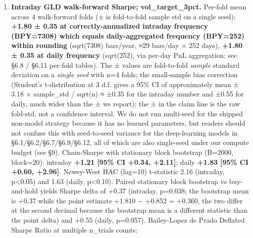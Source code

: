 \documentclass[
]{article}
\providecommand{\tightlist}{%
  \setlength{\itemsep}{0pt}\setlength{\parskip}{0pt}}
\begin{document}
\begin{enumerate}
\def\labelenumi{\arabic{enumi}.}
\tightlist
\item
  \textbf{Intraday GLD walk-forward Sharpe; vol\_target\_3pct.} Per-fold
  mean across 4 walk-forward folds (± is fold-to-fold sample std on a
  single seed): \textbf{+1.80 ± 0.35 at correctly-annualized intraday
  frequency (BPY=7308) which equals daily-aggregated frequency (BPY=252)
  within rounding} (sqrt(7308) bars/year, ≈29 bars/day × 252 days),
  \textbf{+1.80 ± 0.35 at daily frequency} (sqrt(252), via per-day PnL
  aggregation; see §6.8 / §6.11 per-fold tables). The ± values are
  fold-to-fold \emph{sample} standard deviation on a \emph{single seed}
  with n=4 folds; the small-sample bias correction (Student's
  t-distribution at 3 d.f. gives a 95\% CI of approximately mean ± 3.18
  × sample\_std / sqrt(n) ≈ ±0.35 for the intraday number and ±0.55 for
  daily, much wider than the ± we report); the ± in the claim line is
  the raw fold-std, not a confidence interval. We do not run multi-seed
  for the shipped non-model strategy because it has no learned
  parameters, but readers should not confuse this with seed-to-seed
  variance for the deep-learning models in §6.1/§6.2/§6.7/§6.9/§6.12,
  all of which are also single-seed under our compute budget (see §9).
  Chain-Sharpe with stationary block bootstrap (B=2000, block=20):
  intraday \textbf{+1.21 {[}95\% CI +0.34, +2.11{]}}; daily
  \textbf{+1.83 {[}95\% CI +0.60, +2.96{]}}. Newey-West HAC (lag=10)
  t-statistic 2.16 (intraday, p\textless0.05) and 1.63 (daily,
  p\textless0.10). Paired stationary block bootstrap vs buy-and-hold
  yields Sharpe delta of +0.37 (intraday, p=0.038; the bootstrap mean is
  +0.37 while the point estimate +1.810 − +0.852 = +0.360, the two
  differ at the second decimal because the bootstrap mean is a different
  statistic than the point delta) and +0.55 (daily, p=0.057).
  Bailey-Lopez de Prado Deflated Sharpe Ratio at multiple n\_trials
  counts:
\end{enumerate}
\end{document}
